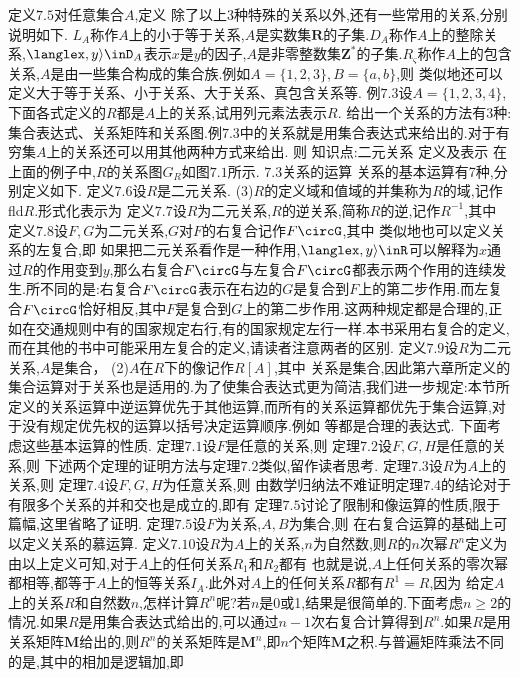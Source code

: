 定义$7.5$对任意集合$A$,定义
除了以上3种特殊的关系以外,还有一些常用的关系,分别说明如下.
$L_{A}$称作$A$上的小于等于关系,$A$是实数集$\mathbf{R}$的子集.$D_{A}$称作$A$上的整除关系,$\langlex,y\rangle\inD_{A}$表示$x$是$y$的因子,$A$是非零整数集$\mathbf{Z}^{*}$的子集.$R_{\varsigma}$称作$A$上的包含关系,$A$是由一些集合构成的集合族.例如$A=\{1,2,3\},B=\{a,b\}$,则
类似地还可以定义大于等于关系、小于关系、大于关系、真包含关系等.
例$7.3$设$A=\{1,2,3,4\}$,下面各式定义的$R$都是$A$上的关系,试用列元素法表示$R$.
给出一个关系的方法有3种:集合表达式、关系矩阵和关系图.例$7.3$中的关系就是用集合表达式来给出的.对于有穷集$A$上的关系还可以用其他两种方式来给出.
则
知识点:二元关系
定义及表示
在上面的例子中,$R$的关系图$G_{R}$如图$7.1$所示.
{$7.3$关系的运算}
关系的基本运算有7种,分别定义如下.
定义$7.6$设$R$是二元关系.
(3)$R$的定义域和值域的并集称为$R$的域,记作fld$R$.形式化表示为
定义$7.7$设$R$为二元关系,$R$的逆关系,简称$R$的逆,记作$R^{-1}$,其中
定义$7.8$设$F,G$为二元关系,$G$对$F$的右复合记作$F\circG$,其中
类似地也可以定义关系的左复合,即
如果把二元关系看作是一种作用,$\langlex,y\rangle\inR$可以解释为$x$通过$R$的作用变到$y$,那么右复合$F\circG$与左复合$F\circG$都表示两个作用的连续发生.所不同的是:右复合$F\circG$表示在右边的$G$是复合到$F$上的第二步作用.而左复合$F\circG$恰好相反,其中$F$是复合到$G$上的第二步作用.这两种规定都是合理的,正如在交通规则中有的国家规定右行,有的国家规定左行一样.本书采用右复合的定义,而在其他的书中可能采用左复合的定义,请读者注意两者的区别.
定义$7.9$设$R$为二元关系,$A$是集合，
(2)$A$在$R$下的像记作$R[A]$,其中
关系是集合,因此第六章所定义的集合运算对于关系也是适用的.为了使集合表达式更为简洁,我们进一步规定:本节所定义的关系运算中逆运算优先于其他运算,而所有的关系运算都优先于集合运算,对于没有规定优先权的运算以括号决定运算顺序.例如
等都是合理的表达式.
下面考虑这些基本运算的性质.
定理$7.1$设$F$是任意的关系,则
定理$7.2$设$F,G,H$是任意的关系,则
下述两个定理的证明方法与定理$7.2$类似,留作读者思考.
定理$7.3$设$R$为$A$上的关系,则
定理$7.4$设$F,G,H$为任意关系,则
由数学归纳法不难证明定理$7.4$的结论对于有限多个关系的并和交也是成立的,即有
定理$7.5$讨论了限制和像运算的性质,限于篇幅,这里省略了证明.
定理$7.5$设$F$为关系,$A,B$为集合,则
在右复合运算的基础上可以定义关系的慕运算.
定义$7.10$设$R$为$A$上的关系,$n$为自然数,则$R$的$n$次幂$R^{n}$定义为
由以上定义可知,对于$A$上的任何关系$R_{1}$和$R_{2}$都有
也就是说,$A$上任何关系的零次幂都相等,都等于$A$上的恒等关系$I_{A}$.此外对$A$上的任何关系$R$都有$R^{1}=R$,因为
给定$A$上的关系$R$和自然数$n$,怎样计算$R^{n}$呢?若$n$是0或1,结果是很简单的.下面考虑$n\geqslant2$的情况.如果$R$是用集合表达式给出的,可以通过$n-1$次右复合计算得到$R^{n}$.如果$R$是用关系矩阵$\boldsymbol{M}$给出的,则$R^{n}$的关系矩阵是$\boldsymbol{M}^{n}$,即$n$个矩阵$\boldsymbol{M}$之积.与普遍矩阵乘法不同的是,其中的相加是逻辑加,即
